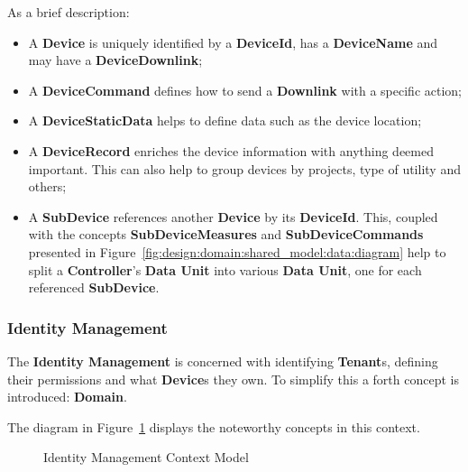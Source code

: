 As a brief description:

\begin{itemize}
   \item A \textbf{Device} is uniquely identified by a \textbf{DeviceId}, has a \textbf{DeviceName} and may have a \textbf{DeviceDownlink};%
   \item A \textbf{DeviceCommand} defines how to send a \textbf{Downlink} with a specific action;
   \item A \textbf{DeviceStaticData} helps to define data such as the device location;
   \item A \textbf{DeviceRecord} enriches the device information with anything deemed important. This can also help to group devices by projects, type of utility and others;
   \item A \textbf{SubDevice} references another \textbf{Device} by its \textbf{DeviceId}. This, coupled with the concepts \textbf{SubDeviceMeasures} and \textbf{SubDeviceCommands} presented in Figure~\ref{fig:design:domain:shared_model:data:diagram} help to split a \textbf{Controller}'s \textbf{Data Unit} into various \textbf{Data Unit}, one for each referenced \textbf{SubDevice}.
\end{itemize}

\subsubsection*{Identity Management}
\label{subsubsec:design:domain:bounded_contexts:identity}

The \textbf{Identity Management} is concerned with identifying \textbf{Tenant}s, defining their permissions and what \textbf{Device}s they own.
To simplify this a forth concept is introduced: \textbf{Domain}.

The diagram in Figure~\ref{fig:design:domain:bounded_contexts:identity:diagram} displays the noteworthy concepts in this context.

\begin{figure}[H]
   \centering
  \resizebox{\columnwidth}{!}
  {
     
  }
  \caption[Identity Management Context Model]{Identity Management Context Model}
  \label{fig:design:domain:bounded_contexts:identity:diagram}
\end{figure}

